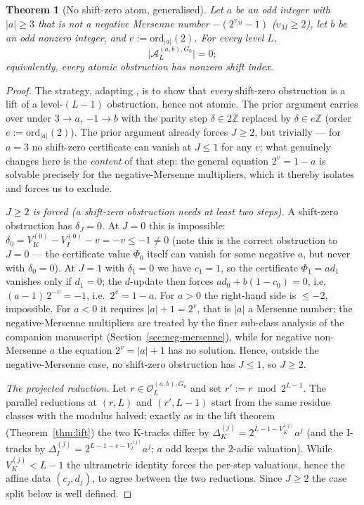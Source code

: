 \documentclass[11pt,reqno]{amsart}
\theoremstyle{plain}
\newtheorem{theorem}{Theorem}[section]
\theoremstyle{definition}
\theoremstyle{remark}
\newcommand{\Z}{\mathbb{Z}}
\newcommand{\Obs}{\mathcal{O}}
\newcommand{\Atom}{\mathcal{A}}
\newcommand{\Vk}{V_{K}}
\newcommand{\Vi}{V_{I}}
\newcommand{\ord}{\mathrm{ord}}
\begin{document}
\begin{theorem}[No shift-zero atom, generalised]\label{thm:no-G0-atom-general}
Let $a$ be an odd integer with $\lvert a \rvert \ge 3$ that is \emph{not}
a negative Mersenne number $-(2^{v_M} - 1)$ ($v_M \ge 2$), let $b$ be an
odd nonzero integer, and $e := \ord_{\lvert a \rvert}(2)$. For every level
$L$,
\[
\lvert \Atom_L^{(a,b), G_0} \rvert = 0;
\]
equivalently, every atomic obstruction has nonzero shift index.
\end{theorem}

\begin{proof}
The strategy, adapting \cite[Theorem~6.2]{ObstructionResidues2026}, is to
show that \emph{every} shift-zero obstruction is a lift of a level-$(L-1)$
obstruction, hence not atomic. The prior argument carries over under
$3 \to a$, $-1 \to b$ with the parity step $\delta \in 2\Z$ replaced by
$\delta \in e\Z$ (order $e := \ord_{\lvert a \rvert}(2)$). The prior argument
already forces $J \ge 2$, but trivially --- for $a = 3$ no shift-zero
certificate can vanish at $J \le 1$ for any $v$; what genuinely changes here
is the \emph{content} of that step: the general equation $2^v = 1 - a$ is
solvable precisely for the negative-Mersenne multipliers, which it thereby
isolates and forces us to exclude.

\emph{$J \ge 2$ is forced (a shift-zero obstruction needs at least two
steps).} A shift-zero obstruction has $\delta_J = 0$. At $J = 0$ this is
impossible: $\delta_0 = \Vk^{(0)} - \Vi^{(0)} - v = -v \le -1 \ne 0$
(note this is the correct obstruction to $J = 0$ --- the certificate value
$\Phi_0$ itself can vanish for some negative $a$, but never with
$\delta_0 = 0$). At $J = 1$ with $\delta_1 = 0$ we have $c_1 = 1$, so the
certificate $\Phi_1 = a d_1$ vanishes only if $d_1 = 0$; the $d$-update
then forces $a d_0 + b(1 - c_0) = 0$, i.e.\ $(a - 1)\,2^{-v} = -1$, i.e.\
$2^{v} = 1 - a$. For $a > 0$ the right-hand side is $\le -2$, impossible.
For $a < 0$ it requires $\lvert a \rvert + 1 = 2^{v}$, that is $\lvert a
\rvert$ a Mersenne number; the negative-Mersenne multipliers are treated
by the finer sub-class analysis of the companion manuscript
(Section~\ref{sec:neg-mersenne}), while for negative non-Mersenne $a$ the
equation $2^{v} = \lvert a \rvert + 1$ has no solution. Hence, outside the
negative-Mersenne case, no shift-zero obstruction has $J \le 1$, so
$J \ge 2$.

\emph{The projected reduction.} Let $r \in \Obs_L^{(a,b), G_0}$ and set
$r' := r \bmod 2^{L-1}$. The parallel reductions at $(r, L)$ and
$(r', L-1)$ start from the same residue classes with the modulus halved;
exactly as in the lift theorem (Theorem~\ref{thm:lift}) the two
K-tracks differ by $\Delta_K^{(j)} = 2^{L-1-\Vk^{(j)}} a^j$ (and the
I-tracks by $\Delta_I^{(j)} = 2^{L-1-v-\Vi^{(j)}} a^j$; $a$ odd keeps the
$2$-adic valuation). While $\Vk^{(j)} < L-1$ the ultrametric identity
forces the per-step valuations, hence the affine data $(c_j, d_j)$, to
agree between the two reductions. Since $J \ge 2$ the case split below is
well defined.


\end{proof}
\end{document}
